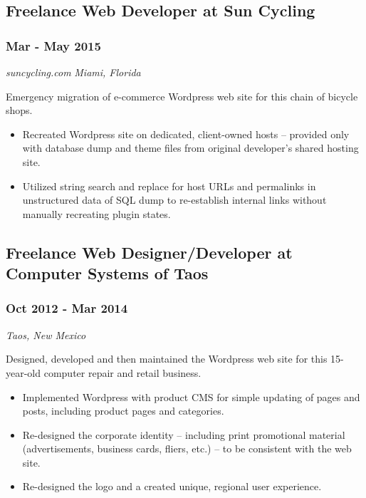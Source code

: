 \documentclass[letterpaper]{article}
\begin{document}
\subsection{Freelance Web Developer at Sun Cycling}
\label{sec-3-2}
\subsubsection{Mar - May 2015}
\label{sec-3-2-1}
\emph{suncycling.com} \hfill \emph{Miami, Florida}\\
\vspace{0.1in}

Emergency migration of e-commerce Wordpress web site for this chain of bicycle shops.
\vspace{0.1in}

\begin{itemize}
\item Recreated Wordpress site on dedicated, client-owned hosts -- provided only with database dump and theme files from original developer's shared hosting site.
\item Utilized string search and replace for host URLs and permalinks in unstructured data of SQL dump to re-establish internal links without manually recreating plugin states.
\end{itemize}

\subsection{Freelance Web Designer/Developer at Computer Systems of Taos}
\label{sec-3-3}
\subsubsection{Oct 2012 - Mar 2014}
\label{sec-3-3-1}
\emph{Taos, New Mexico}\\
\vspace{0.1in}

Designed, developed and then maintained the Wordpress web site for this 15-year-old computer repair and retail business.
\vspace{0.1in}

\begin{itemize}
\item Implemented Wordpress with product CMS for simple updating of pages and posts, including product pages and categories.
\item Re-designed the corporate identity -- including print promotional material (advertisements, business cards, fliers, etc.) -- to be consistent with the web site.
\item Re-designed the logo and a created unique, regional user experience.
\end{itemize}
\end{document}
